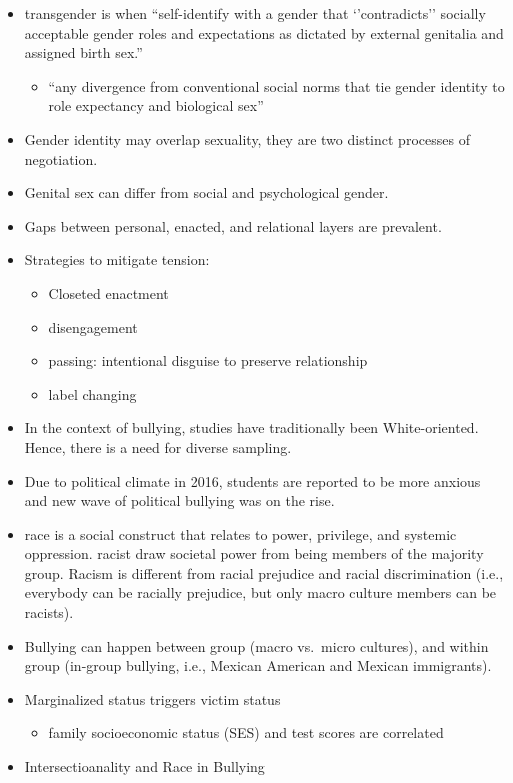\documentclass[
]{book}
\providecommand{\tightlist}{%
  \setlength{\itemsep}{0pt}\setlength{\parskip}{0pt}}
\begin{document}
\citep{Nuru_2014}

\begin{itemize}
\item
  transgender is when ``self-identify with a gender that `'contradicts'' socially acceptable gender roles and
  expectations as dictated by external genitalia and assigned birth sex.''

  \begin{itemize}
  \tightlist
  \item
    ``any divergence from conventional social norms that tie gender identity to role expectancy and biological sex''
    \citep{Bornstein_2013}
  \end{itemize}
\item
  Gender identity may overlap sexuality, they are two distinct processes of negotiation.
\item
  Genital sex can differ from social and psychological gender.
\item
  Gaps between personal, enacted, and relational layers are prevalent.
\item
  Strategies to mitigate tension:

  \begin{itemize}
  \item
    Closeted enactment
  \item
    disengagement
  \item
    passing: intentional disguise to preserve relationship
  \item
    label changing
  \end{itemize}
\end{itemize}

\citep{Harris_2018}

\begin{itemize}
\item
  In the context of bullying, studies have traditionally been White-oriented. Hence, there is a need for diverse
  sampling.
\item
  Due to political climate in 2016, students are reported to be more anxious and new wave of political bullying was on
  the rise.
\item
  race is a social construct that relates to power, privilege, and systemic oppression. racist draw societal power
  from being members of the majority group. Racism is different from racial prejudice and racial discrimination (i.e.,
  everybody can be racially prejudice, but only macro culture members can be racists).
\item
  Bullying can happen between group (macro vs.~micro cultures), and within group (in-group bullying, i.e., Mexican
  American and Mexican immigrants).
\item
  Marginalized status triggers victim status

  \begin{itemize}
  \tightlist
  \item
    family socioeconomic status (SES) and test scores are correlated
  \end{itemize}
\item
  Intersectioanality and Race in Bullying
\end{itemize}
\end{document}
